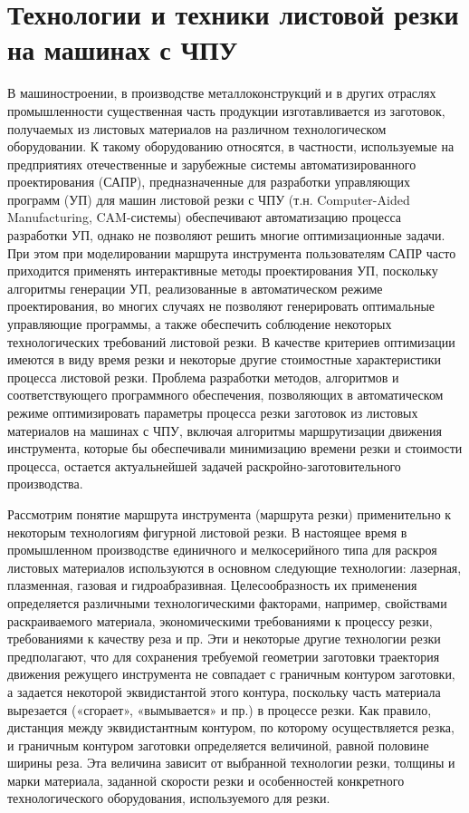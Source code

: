 \documentclass[12pt]{report}
\begin{document}
\section{Технологии и техники листовой резки на машинах с ЧПУ}

В машиностроении, в производстве металлоконструкций
и в других отраслях промышленности существенная часть продукции
изготавливается из заготовок,
получаемых из листовых материалов на различном технологическом оборудовании.
К такому оборудованию относятся, в частности,
используемые на предприятиях отечественные и зарубежные
системы автоматизированного проектирования (САПР),
предназначенные для разработки управляющих программ (УП)
для машин листовой резки с ЧПУ
(т.н. Computer-Aided Manufacturing, CAM-системы)
обеспечивают автоматизацию процесса разработки УП,
однако не позволяют решить многие оптимизационные задачи.
При этом при моделировании маршрута инструмента пользователям
САПР часто приходится применять интерактивные методы проектирования УП,
поскольку алгоритмы генерации УП,
реализованные в автоматическом режиме проектирования,
во многих случаях не позволяют генерировать оптимальные управляющие программы,
а также обеспечить соблюдение некоторых технологических требований листовой резки.
В качестве критериев оптимизации имеются в виду время резки и
некоторые другие стоимостные характеристики процесса листовой резки.
Проблема разработки методов, алгоритмов и соответствующего программного обеспечения,
позволяющих в автоматическом режиме оптимизировать параметры
процесса резки заготовок из листовых материалов на машинах с ЧПУ,
включая алгоритмы маршрутизации движения инструмента,
которые бы обеспечивали минимизацию времени резки и стоимости процесса,
остается актуальнейшей задачей раскройно-заготовительного производства.

Рассмотрим понятие маршрута инструмента (маршрута резки)
применительно к некоторым технологиям фигурной листовой резки.
В настоящее время в промышленном производстве
единичного и мелкосерийного типа для раскроя листовых материалов
используются в основном следующие технологии:
лазерная, плазменная, газовая и гидроабразивная.
Целесообразность их применения определяется различными технологическими факторами,
например, свойствами раскраиваемого материала,
экономическими требованиями к процессу резки,
требованиями к качеству реза и пр.
Эти и некоторые другие технологии резки предполагают,
что для сохранения требуемой геометрии заготовки
траектория движения режущего инструмента не совпадает
с граничным контуром заготовки,
а задается некоторой эквидистантой этого контура,
поскольку часть материала вырезается («сгорает», «вымывается» и пр.)
в процессе резки.
Как правило, дистанция между эквидистантным контуром,
по которому осуществляется резка, и граничным контуром заготовки определяется величиной,
равной половине ширины реза.
Эта величина зависит от выбранной технологии резки,
толщины и марки материала, заданной скорости резки
и особенностей конкретного технологического оборудования,
используемого для резки.
\end{document}
